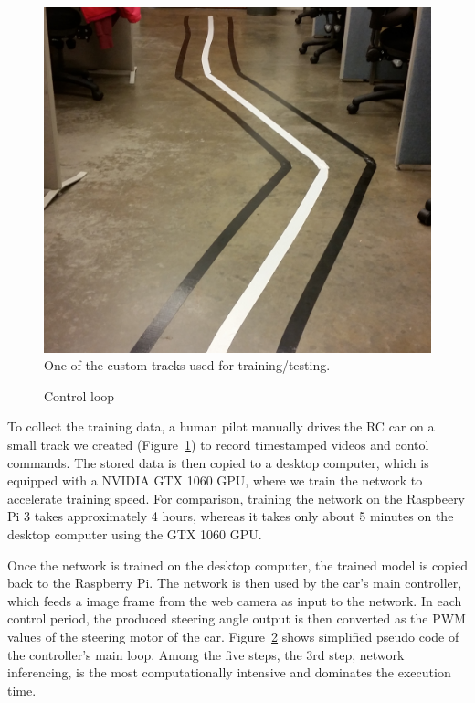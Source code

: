 \begin{figure}[t]
  \centering
  \includegraphics[width=.65\textwidth]{figs/track_new2}
  \caption{One of the custom tracks used for training/testing.}
  \label{fig:track}
\end{figure}

\begin{figure}[t]
  
  \caption{Control loop}
  \label{fig:controlloop}
\end{figure}

To collect the training data, a human pilot manually drives the RC car
on a small track we created (Figure~\ref{fig:track}) to record
timestamped videos and contol commands. The stored data is then copied 
to a desktop computer, which is equipped with a NVIDIA GTX 1060 GPU, 
where we train the network to accelerate training speed. 
For comparison, training the network on the Raspbeery Pi 3 takes
approximately 4 hours, whereas it takes only about 5 minutes on the
desktop computer using the GTX 1060 GPU.

Once the network is trained on the desktop computer, the trained model
is copied back to the Raspberry Pi. The network is then used
by the car's main controller, which feeds a image frame from the web
camera as input to the network. In each control period, the produced 
steering angle output is then converted as the PWM values of the 
steering motor of the car. Figure~\ref{fig:controlloop} shows simplified 
pseudo code of the controller's main loop. Among the five steps, the 3rd step, 
network inferencing, is the most computationally intensive and dominates the
execution time.

